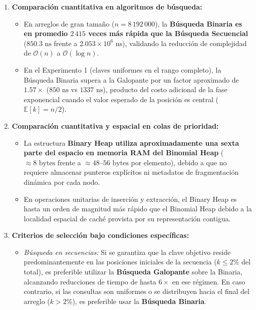\documentclass[11pt,letterpaper]{article}
\begin{document}
\begin{enumerate}
    \item \textbf{Comparación cuantitativa en algoritmos de búsqueda:}
    \begin{itemize}
        \item En arreglos de gran tamaño ($n = 8\,192\,000$), la \textbf{Búsqueda Binaria es en promedio $2\,415$ veces más rápida que la Búsqueda Secuencial} ($850.3\text{ ns}$ frente a $2.053\times 10^6\text{ ns}$), validando la reducción de complejidad de $\mathcal{O}(n)$ a $\mathcal{O}(\log n)$.
        \item En el Experimento 1 (claves uniformes en el rango completo), la Búsqueda Binaria supera a la Galopante por un factor aproximado de $1.57\times$ ($850\text{ ns}$ vs $1337\text{ ns}$), producto del costo adicional de la fase exponencial cuando el valor esperado de la posición es central ($\mathbb{E}[k] = n/2$).
    \end{itemize}
    \item \textbf{Comparación cuantitativa y espacial en colas de prioridad:}
    \begin{itemize}
        \item La estructura \textbf{Binary Heap utiliza aproximadamente una sexta parte del espacio en memoria RAM del Binomial Heap} ($\approx 8\text{ bytes}$ frente a $\approx 48\text{--}56\text{ bytes}$ por elemento), debido a que no requiere almacenar punteros explícitos ni metadatos de fragmentación dinámica por cada nodo.
        \item En operaciones unitarias de inserción y extracción, el Binary Heap es hasta un orden de magnitud más rápido que el Binomial Heap debido a la localidad espacial de caché provista por su representación contigua.
    \end{itemize}
    \item \textbf{Criterios de selección bajo condiciones específicas:}
    \begin{itemize}
        \item \textit{Búsqueda en secuencias:} Si se garantiza que la clave objetivo reside predominantemente en las posiciones iniciales de la secuencia ($k \le 2\%$ del total), es preferible utilizar la \textbf{Búsqueda Galopante} sobre la Binaria, alcanzando reducciones de tiempo de hasta $6\times$ en ese régimen. En caso contrario, si las consultas son uniformes o se distribuyen hacia el final del arreglo ($k > 2\%$), es preferible usar la \textbf{Búsqueda Binaria}.
        

\end{itemize}
\end{enumerate}
\end{document}
